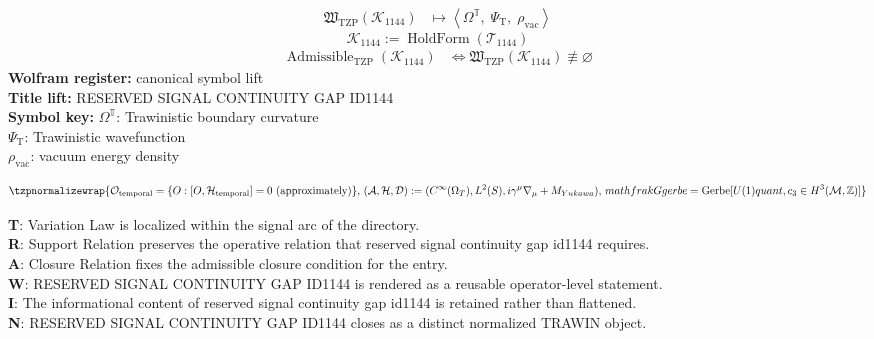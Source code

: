 \noindent
\begin{minipage}[t]{0.48\linewidth}
\begingroup
\small
\[
\begin{aligned}
\mathfrak{W}_{\mathrm{TZP}}\!\left(\mathcal{K}_{1144}\right)
&\longmapsto
\left\langle \Omega^{\mathbb{T}},\; \Psi_{\mathrm{T}},\; \rho_{\mathrm{vac}} \right\rangle
\end{aligned}
\]
\[
\mathcal{K}_{1144}
:=
\operatorname{HoldForm}\!\left(\mathcal{T}_{1144}\right)
\]
\[
\begin{aligned}
\operatorname{Admissible}_{\mathrm{TZP}}\!\left(\mathcal{K}_{1144}\right)
&\Longleftrightarrow
\mathfrak{W}_{\mathrm{TZP}}\!\left(\mathcal{K}_{1144}\right)\not\equiv\varnothing
\end{aligned}
\]
\textbf{Wolfram register:} canonical symbol lift\\
\textbf{Title lift:} RESERVED SIGNAL CONTINUITY GAP ID1144\\
\textbf{Symbol key:} \(\Omega^{\mathbb{T}}\): Trawinistic boundary curvature\\ \(\Psi_{\mathrm{T}}\): Trawinistic wavefunction\\ \(\rho_{\mathrm{vac}}\): vacuum energy density
\par
\endgroup
\end{minipage}\hfill
\begin{minipage}[t]{0.48\linewidth}
\[
\tzpnormalizewrap{\mathcal{O}_{\text{temporal}} = \{O : [O, \mathcal{H}_{\text{temporal}}] = 0 \text{ (approximately)}\},\,(\mathcal{A}, \mathcal{H}, \mathcal{D}) := (C^\infty(\Omega_T), L^2(S), i\gamma^\mu\nabla_\mu + M_{Yukawa}),\,mathfrak{G} {gerbe} = \text{Gerbe}[U(1) {quant}, c_3 \in H^3(\mathcal{M}, \mathbb{Z})]}
\]

\small
\textbf{T}: Variation Law is localized within the signal arc of the directory.\\
\textbf{R}: Support Relation preserves the operative relation that reserved signal continuity gap id1144 requires.\\
\textbf{A}: Closure Relation fixes the admissible closure condition for the entry.\\
\textbf{W}: RESERVED SIGNAL CONTINUITY GAP ID1144 is rendered as a reusable operator-level statement.\\
\textbf{I}: The informational content of reserved signal continuity gap id1144 is retained rather than flattened.\\
\textbf{N}: RESERVED SIGNAL CONTINUITY GAP ID1144 closes as a distinct normalized TRAWIN object.
\normalsize
\end{minipage}

